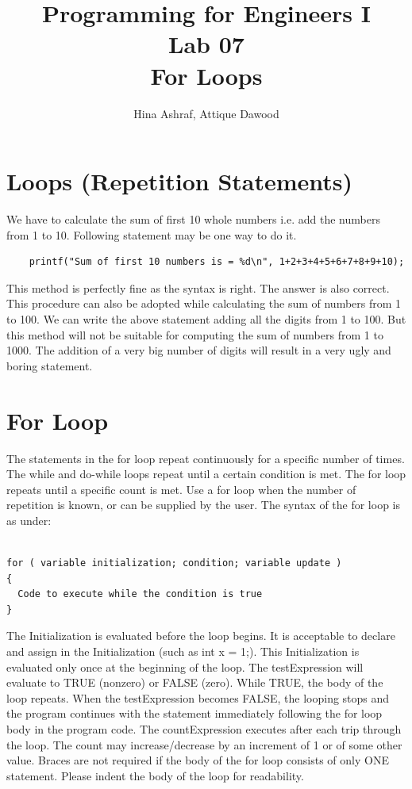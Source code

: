 \documentclass{article}
\title{Programming for Engineers I\\Lab 07\\For Loops}
\author{Hina Ashraf, Attique Dawood}
\begin{document}
\maketitle

\section{Loops (Repetition Statements)}
We have to calculate the sum of first 10 whole numbers i.e. add the numbers from 1 to 10. Following statement may be one way to do it.
\begin{verbatim}
    printf("Sum of first 10 numbers is = %d\n", 1+2+3+4+5+6+7+8+9+10);
\end{verbatim}
This method is perfectly fine as the syntax is right. The answer is also correct. This procedure can also be adopted while calculating the sum of numbers from 1 to 100. We can write the above statement adding all the digits from 1 to 100. But this method will not be suitable for computing the sum of numbers from 1 to 1000. The addition of a very big number of digits will result in a very ugly and boring statement. 


\section{For Loop}
The statements in the for loop repeat continuously for a specific number of times.  The while and do-while loops repeat until a certain condition is met.  The for loop repeats until a specific count is met.  Use a for loop when the number of repetition is known, or can be supplied by the user. 
The syntax of the for loop is as under:

\begin{verbatim}

for ( variable initialization; condition; variable update ) 
{
  Code to execute while the condition is true
}

\end{verbatim}

The Initialization is evaluated before the loop begins.  It is acceptable to declare and assign in the Initialization (such as int x = 1;).  This Initialization is evaluated only once at the beginning of the loop.
The testExpression will evaluate to TRUE (nonzero) or FALSE (zero).  While TRUE, the body of the loop repeats.  When the testExpression becomes FALSE, the looping stops and the program continues with the statement immediately following the for loop body in the program code.
The countExpression executes after each trip through the loop.  The count may increase/decrease by an increment of 1 or of some other value. 
Braces are not required if the body of the for loop consists of only ONE statement.  Please indent the body of the loop for readability.
\end{document}
